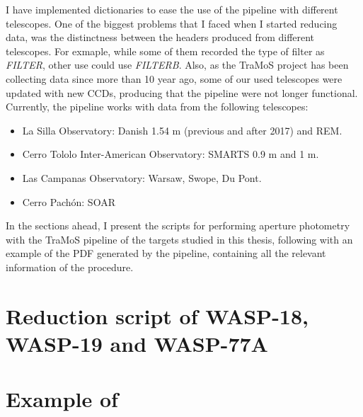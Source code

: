 I have implemented dictionaries to ease the use of the pipeline with different telescopes. One of the biggest problems that I faced when I started reducing data, was the distinctness between the headers produced from different telescopes. For exmaple, while some of them recorded the type of filter as \textit{FILTER}, other use could use \textit{FILTERB}. Also, as the TraMoS project has been collecting data since more than 10 year ago, some of our used telescopes were updated with new CCDs, producing that the pipeline were not longer functional. Currently, the pipeline works with data from the following telescopes: 
\begin{itemize}
\item La Silla Observatory: Danish 1.54 m (previous and after 2017) and REM.
\item Cerro Tololo Inter-American Observatory: SMARTS 0.9 m and 1 m.
\item Las Campanas Observatory: Warsaw, Swope, Du Pont.
\item Cerro Pachón: SOAR
\end{itemize}

In the sections ahead, I present the scripts for performing aperture photometry with the TraMoS pipeline of the targets studied in this thesis, following with an example of the PDF generated by the pipeline, containing all the relevant information of the procedure.

\section{Reduction script of WASP-18, WASP-19 and WASP-77A}



\section{Example of } 